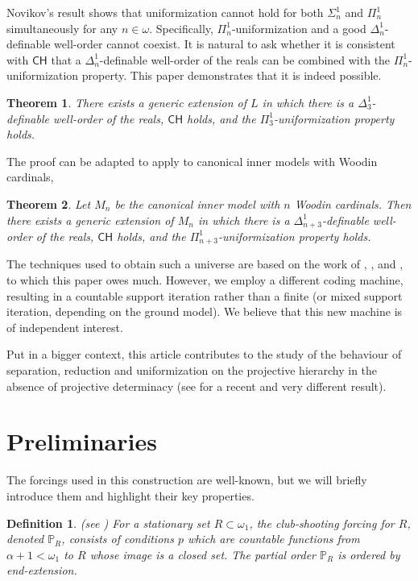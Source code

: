 \documentclass[a4paper,11pt]{article}
\newtheorem{definition}[theorem]{Definition}
\newtheorem*{theorem*}{Theorem}
\newcommand{\forceP}{\mathbb{P}}
\begin{document}
Novikov's result shows that uniformization cannot hold for both \( \Sigma^1_n \) and \( \Pi^1_n \) simultaneously for any \( n \in \omega \). Specifically, \( \Pi^1_n \)-uniformization and a good \( \Delta^1_n \)-definable well-order cannot coexist. It is natural to ask whether it is consistent with \( \mathsf{CH} \) that a \( \Delta^1_n \)-definable well-order of the reals can be combined with the \( \Pi^1_n \)-uniformization property. This paper demonstrates that it is indeed possible.

\begin{theorem*}
There exists a generic extension of \( L \) in which there is a \( \Delta^1_3 \)-definable well-order of the reals, \( \mathsf{CH} \) holds, and the \( \Pi^1_3 \)-uniformization property holds.
\end{theorem*}
The proof can be adapted to apply to canonical inner models with Woodin cardinals, 

\begin{theorem*}
Let \( M_n \) be the canonical inner model with \( n \) Woodin cardinals. Then there exists a generic extension of \( M_n \) in which there is a \( \Delta^1_{n+3} \)-definable well-order of the reals, \( \mathsf{CH} \) holds, and the \( \Pi^1_{n+3} \)-uniformization property holds.
\end{theorem*}
The techniques used to obtain such a universe are based on the work of \cite{Ho1}, \cite{Ho2}, and \cite{Ho3}, to which this paper owes much. However, we employ a different coding machine, resulting in a countable support iteration rather than a finite (or mixed support iteration, depending on the ground model). We believe that this new machine is of independent interest.

Put in a bigger context, this article contributes to the study of the behaviour of separation, reduction and uniformization on the projective hierarchy in the absence of projective determinacy (see \cite{Ho5} for a recent and very different result).



\section{Preliminaries}


The forcings used in this construction are well-known, but we will briefly introduce them and highlight their key properties.

\begin{definition}(see \cite{BHK})
For a stationary set \( R \subset \omega_1 \), the club-shooting forcing for \( R \), denoted \( \forceP_R \), consists of conditions \( p \) which are countable functions from \( \alpha+1 < \omega_1 \) to \( R \) whose image is a closed set. The partial order \( \forceP_R \) is ordered by end-extension.
\end{definition}
\end{document}
